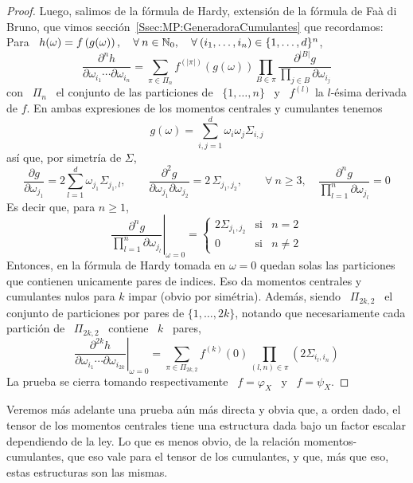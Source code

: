 \begin{proof}
  Luego, salimos de la f\'ormula de  Hardy, extensi\'on de la f\'ormula de Fa\`a
  di   Bruno,   que   vimos   secci\'on~\ref{Ssec:MP:GeneradoraCumulantes}   que
  recordamos: Para \ $h(\omega) =  f\left( g(\omega) \right), \quad \forall \: n
  \in \mathbb{N}_0,  \quad \forall \:  (i_1 , \ldots ,  i_n ) \in  \{ 1 , \ldots  , d
  \}^n$,
  \[
  \frac{\partial^n  h}{\partial  \omega_{i_1}  \cdots \partial  \omega_{i_n}}  =
  \sum_{\pi  \in \Pi_n}  f^{(|\pi|)}\left( g(\omega)  \right) \prod_{B  \in \pi}
  \frac{\partial^{|B|} g}{\displaystyle \prod_{j \in B} \partial \omega_{i_j}}
  \]
  con \ $\Pi_n$ \ el conjunto de las particiones de \ $\{ 1 , \ldots , n \}$ \ y
  \ $f^{(l)}$ la $l$-\'esima derivada de $f$.  En ambas expresiones de los momentos
  centrales y cumulantes tenemos
  \[
  g(\omega) = \sum_{i,j=1}^d \omega_i \omega_j \Sigma_{i,j}
  \]
  as\'i que, por simetr\'ia de $\Sigma$,
  \[
  \frac{\partial  g}{\partial   \omega_{j_1}}  =  2   \sum_{l=1}^d  \omega_{j_1}
  \Sigma_{j_1,l},  \qquad  \frac{\partial^2  g}{\partial  \omega_{j_1}  \partial
    \omega_{j_2}}  =  2 \, \Sigma_{j_1,j_2},  \qquad  \forall  \:  n \ge  3,  \quad
  \frac{\partial^n g}{\prod_{l=1}^n \partial \omega_{j_l}} = 0
  \]
  Es decir que, para $n \ge 1$,
  \[
  \left.      \frac{\partial^n    g}{\prod_{l=1}^n     \partial    \omega_{j_l}}
  \right|_{\omega = 0} = \left\{\begin{array}{ccl}
  2   \Sigma_{j_1,j_2} & \mbox{si} & n = 2\\[2mm]
  0 & \mbox{si} & n \ne 2
  \end{array}\right.
  \]
  Entonces,  en la f\'ormula  de Hardy  tomada en  $\omega =  0$ quedan  solas las
  particiones  que  contienen unicamente  pares  de  indices.   Eso da  momentos
  centrales y cumulantes nulos para $k$ impar (obvio por sim\'etria). Adem\'as,
  siendo \  $\Pi_{2 k , 2}$  \ el conjunto de  particiones por pares de  $\{ 1 ,
  \ldots , 2 k \}$, notando que necesariamente cada partici\'on de \ $\Pi_{2 k ,
    2}$ \ contiene \ $k$ \ pares,
  \[
  \left.    \frac{\partial^{2  k}   h}{\partial  \omega_{i_1}   \cdots  \partial
      \omega_{i_{2  k}}}\right|_{\omega =  0} =  \sum_{\pi  \in \Pi_{2  k ,  2}}
  f^{(k)}(0) \prod_{(l,n) \in \pi} \left( 2 \Sigma_{i_l,i_n} \right)
  \]
  La prueba  se cierra  tomando respectivamente  \ $f =  \varphi_X$ \  y \  $f =
  \psi_X$.
\end{proof}
%
Veremos m\'as adelante una prueba a\'un m\'as directa y obvia que, a orden dado,
el tensor  de los momentos  centrales tiene una  estructura dada bajo  un factor
escalar  dependiendo  de la  ley.   Lo  que es  menos  obvio,  de la  relaci\'on
momentos-cumulantes, que eso vale para el tensor de los cumulantes, y que, m\'as
que eso, estas estructuras son las mismas.

